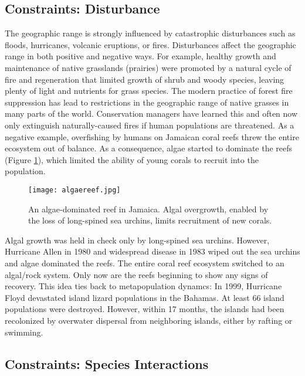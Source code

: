 \documentclass[11pt, hidelinks]{article}
\begin{document}
\subsection{Constraints: Disturbance}

The geographic range is strongly influenced by catastrophic disturbances such as floods, hurricanes, volcanic eruptions, or fires. Disturbances affect the geographic range in both positive and negative ways. For example, healthy growth and maintenance of native grasslands (prairies) were promoted by a natural cycle of fire and regeneration that limited growth of shrub and woody species, leaving plenty of light and nutrients for grass species. The modern practice of forest fire suppression has lead to restrictions in the geographic range of native grasses in many parts of the world.  Conservation managers have learned this and often now only extinguish naturally-caused fires if human populations are threatened. As a negative example, overfishing by humans on Jamaican coral reefs threw the entire ecosystem out of balance.  As a consequence, algae started to dominate the reefs (Figure \ref{reef}), which limited the ability of young corals to recruit into the population.  

\begin{figure}[hb]
	\centering
	\texttt{[image: algaereef.jpg]}
	\caption{An algae-dominated reef in Jamaica. Algal overgrowth, enabled by the loss of long-spined sea urchins, limits recruitment of new corals.\label{reef}}
\end{figure}

Algal growth was held in check only by long-spined sea urchins.  However, Hurricane Allen in 1980 and widespread disease in 1983 wiped out the sea urchins and algae dominated the reefs.  The entire coral reef ecosystem switched to an algal/rock system.  Only now are the reefs beginning to show any signs of recovery. This idea ties back to metapopulation dynamcs: In 1999, Hurricane Floyd devastated island lizard populations in the Bahamas.  At least 66 island populations were destroyed. However, within 17 months, the islands had been recolonized by overwater dispersal from neighboring islands, either by rafting or swimming.

\subsection{Constraints: Species Interactions}
\end{document}
